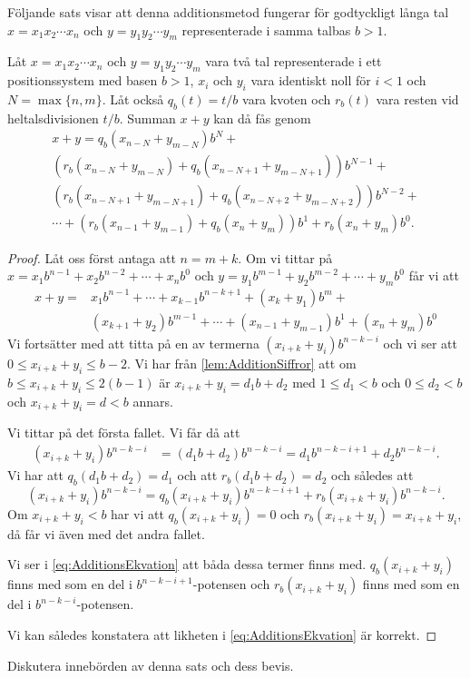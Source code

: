 Följande sats visar att denna additionsmetod fungerar för godtyckligt långa tal
\(x=x_1x_2\cdots x_n\) och \(y=y_1y_2\cdots y_m\) representerade i samma talbas
\(b>1\).
\begin{theorem}[Additionsalgoritm]
  Låt \(x=x_1x_2\cdots x_n\) och \(y=y_1y_2\cdots y_m\) vara två tal
  representerade i ett positionssystem med basen \(b>1\),
  \(x_i\) och \(y_i\) vara identiskt noll för \(i<1\) och \(N=\max\{n,m\}\).
  Låt också \(q_b(t)=t/b\) vara kvoten och \(r_b(t)\) vara resten vid
  heltalsdivisionen \(t/b\).
  Summan \(x+y\) kan då fås genom 
  \begin{multline}\label{eq:AdditionsEkvation}
    x+y= q_b(x_{n-N}+y_{m-N})b^N + \\
    \left(r_b(x_{n-N}+y_{m-N})+q_b(x_{n-N+1}+y_{m-N+1})\right)b^{N-1} +\\
    \left(r_b(x_{n-N+1}+y_{m-N+1})+q_b(x_{n-N+2}+y_{m-N+2})\right)b^{N-2}
      + \\
    \cdots + \left(r_b(x_{n-1}+y_{m-1})+q_b(x_n+y_m)\right)b^1 +
    r_b(x_n+y_{m})b^0.
  \end{multline}
\end{theorem}
\begin{proof}
  Låt oss först antaga att \(n=m+k\).
  Om vi tittar på \(x=x_1 b^{n-1} + x_2 b^{n-2} + \cdots + x_n b^0\) och
  \(y = y_1 b^{m-1} + y_2 b^{m-2} + \cdots + y_m b^0\) får vi att
  \begin{align*}
    x+y=&x_1b^{n-1}+\cdots+x_{k-1}b^{n-k+1}+(x_k+y_1)b^m+\\
    &(x_{k+1}+y_2)b^{m-1}+\cdots+(x_{n-1}+y_{m-1})b^1+(x_n+y_m)b^0
  \end{align*}
  Vi fortsätter med att titta på en av termerna \((x_{i+k}+y_i)b^{n-k-i}\)
  och vi ser att \(0\leq x_{i+k}+y_i\leq b-2\).
  Vi har från \cref{lem:AdditionSiffror} att om \(b\leq x_{i+k}+y_i\leq
  2(b-1)\) är \(x_{i+k}+y_i = d_1b+d_2\) med \(1\leq d_1<b\) och \(0\leq
  d_2<b\) och \(x_{i+k}+y_i = d < b\) annars.

  Vi tittar på det första fallet.
  Vi får då att
  \begin{align*}
    (x_{i+k}+y_i)b^{n-k-i} &= (d_1b+d_2)b^{n-k-i}
      = d_1b^{n-k-i+1}+d_2b^{n-k-i}.
  \end{align*}
  Vi har att \(q_b(d_1b+d_2)=d_1\) och att \(r_b(d_1b+d_2)=d_2\) och således
  att
  \begin{equation*}
    (x_{i+k}+y_i)b^{n-k-i} = q_b(x_{i+k}+y_i)b^{n-k-i+1} +
    r_b(x_{i+k}+y_i)b^{n-k-i}.
  \end{equation*}
  Om \(x_{i+k}+y_i<b\) har vi att \(q_b(x_{i+k}+y_i)=0\) och
  \(r_b(x_{i+k}+y_i)=x_{i+k}+y_i\), då får vi även med det andra fallet.

  Vi ser i \cref{eq:AdditionsEkvation} att båda dessa termer finns med.
  \(q_b(x_{i+k}+y_i)\) finns med som en del i \(b^{n-k-i+1}\)-potensen och
  \(r_b(x_{i+k}+y_i)\) finns med som en del i \(b^{n-k-i}\)-potensen.

  Vi kan således konstatera att likheten i \cref{eq:AdditionsEkvation} är
  korrekt.
\end{proof}
\begin{exercise}
  Diskutera innebörden av denna sats och dess bevis.
\end{exercise}

